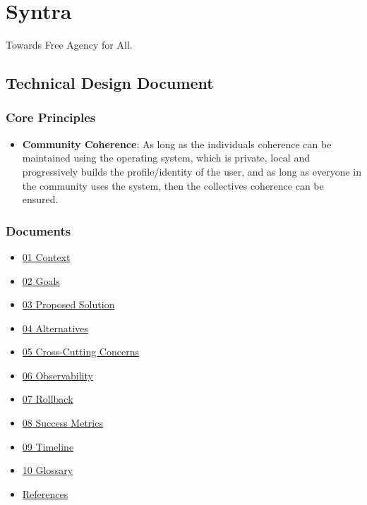 \documentclass[12pt,a4paper]{article}
\providecommand{\tightlist}{\setlength{\itemsep}{0pt}\setlength{\parskip}{0pt}}
\begin{document}
\section{Syntra}\label{syntra}

Towards Free Agency for All.

\subsection{Technical Design Document}\label{technical-design-document}

\subsubsection{Core Principles}\label{core-principles}

\begin{itemize}
\tightlist
\item
  \textbf{Community Coherence}: As long as the
  individual\textquotesingle s coherence can be maintained using the
  operating system, which is private, local and progressively builds the
  profile/identity of the user, and as long as everyone in the community
  uses the system, then the collective\textquotesingle s coherence can
  be ensured.
\end{itemize}

\subsubsection{Documents}\label{documents}

\begin{itemize}
\tightlist
\item
  \href{01-context.html}{01 Context}
\item
  \href{02-goals.html}{02 Goals}
\item
  \href{03-proposed-solution.html}{03 Proposed Solution}
\item
  \href{04-alternatives.html}{04 Alternatives}
\item
  \href{05-cross-cutting-concerns.html}{05 Cross-Cutting Concerns}
\item
  \href{06-observability.html}{06 Observability}
\item
  \href{07-rollback.html}{07 Rollback}
\item
  \href{08-success-metrics.html}{08 Success Metrics}
\item
  \href{09-timeline.html}{09 Timeline}
\item
  \href{10-glossary.html}{10 Glossary}
\item
  \href{references.html}{References}
\end{itemize}
\end{document}

